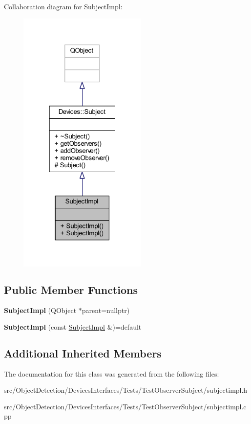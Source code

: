 Collaboration diagram for Subject\+Impl\+:\nopagebreak
\begin{figure}[H]
\begin{center}
\leavevmode
\includegraphics[width=181pt]{d9/d7f/class_subject_impl__coll__graph}
\end{center}
\end{figure}
\subsection*{Public Member Functions}
\begin{DoxyCompactItemize}
\item 
\mbox{\label{class_subject_impl_a8cd9bc47afd82f8a957c7a56154cd528}} 
{\bfseries Subject\+Impl} (Q\+Object $\ast$parent=nullptr)
\item 
\mbox{\label{class_subject_impl_a62f084a4816178f5f74514f95af03515}} 
{\bfseries Subject\+Impl} (const \hyperlink{class_subject_impl}{Subject\+Impl} \&)=default
\end{DoxyCompactItemize}
\subsection*{Additional Inherited Members}


The documentation for this class was generated from the following files\+:\begin{DoxyCompactItemize}
\item 
src/\+Object\+Detection/\+Devices\+Interfaces/\+Tests/\+Test\+Observer\+Subject/subjectimpl.\+h\item 
src/\+Object\+Detection/\+Devices\+Interfaces/\+Tests/\+Test\+Observer\+Subject/subjectimpl.\+cpp\end{DoxyCompactItemize}
